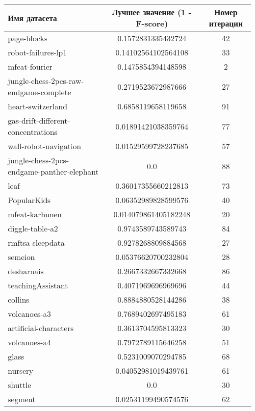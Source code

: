 \documentclass[times,specification,annotation]{itmo-student-thesis}
\begin{document}
	\begin{center}
		\begin{longtable}{ |m{5cm}|c|c| } 
			\hline
			\textbf{Имя датасета} & \textbf{Лучшее значение (1 - F-score)} & \textbf{Номер итерации} \\ 
			\hline\hline
			page-blocks & 0.1572831335432724 & 42 \\
			\hline
			robot-failures-lp1 & 0.14102564102564108 & 33 \\
			\hline
			mfeat-fourier & 0.1475854394148598 & 2 \\
			\hline
			jungle-chess-2pcs-raw-endgame-complete & 0.2719523672987666 & 27 \\
			\hline
			heart-switzerland & 0.6858119658119658 & 91 \\
			\hline
			gas-drift-different-concentrations & 0.01891421038359764 & 77 \\
			\hline
			wall-robot-navigation & 0.01529599728237685 & 57 \\
			\hline
			jungle-chess-2pcs-endgame-panther-elephant & 0.0 & 88 \\
			\hline
			leaf & 0.36017355660212813 & 73 \\
			\hline
			PopularKids & 0.06352989828599576 & 40 \\
			\hline
			mfeat-karhunen & 0.014079861405182248 & 20 \\
			\hline
			diggle-table-a2 & 0.9743589743589743 & 84 \\
			\hline
			rmftsa-sleepdata & 0.9278268809884568 & 27 \\
			\hline
			semeion & 0.05376620700232804 & 28 \\
			\hline
			desharnais & 0.2667332667332668 & 86 \\
			\hline
			teachingAssistant & 0.4071969696969696 & 44 \\
			\hline
			collins & 0.8884880528144286 & 38 \\
			\hline
			volcanoes-a3 & 0.7689402697495183 & 61 \\
			\hline
			artificial-characters & 0.3613704595813323 & 30 \\
			\hline
			volcanoes-a4 & 0.7972789115646258 & 51 \\
			\hline
			glass & 0.5231009070294785 & 68 \\
			\hline
			nursery & 0.04052981019439761 & 61 \\
			\hline
			shuttle & 0.0 & 30 \\
			\hline
			segment & 0.02531199490574576 & 62 \\

\end{longtable}
\end{center}
\end{document}
